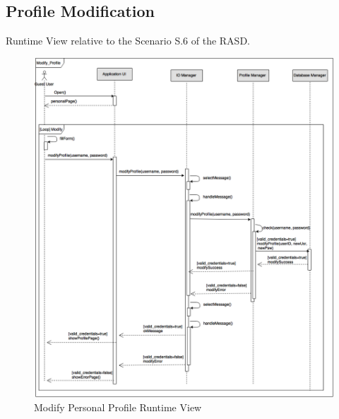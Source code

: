 \documentclass[../../../../../../dd.tex]{subfiles}
\begin{document}
	\subsection{Profile Modification}
		Runtime View relative to the Scenario S.6 of the RASD.
		\begin{figure}[H]
				\centering
				\includegraphics[width=\textwidth, scale=0.5]{../images/SequenceDiagrams/ModifyProfile.png}
			\caption{Modify Personal Profile Runtime View}\label{fig:ModifyProfile}
		\end{figure}
\end{document}
